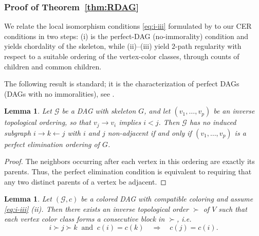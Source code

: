\documentclass[12pt]{amsart}
\theoremstyle{plain}
\newtheorem{lemma}[theorem]{Lemma}
\theoremstyle{definition}
\theoremstyle{remark}
\newcommand{\1}{\mathbf{1}}
\begin{document}
\subsubsection{Proof of Theorem~\ref{thm:RDAG}}

We relate the local isomorphism conditions \eqref{eq:i-iii} formulated by \citet{Seigal23} to our CER conditions in two steps:
(i) is the perfect-DAG (no-immorality) condition and yields chordality of the skeleton, while
(ii)--(iii) yield $2$-path regularity with respect to a suitable
ordering of the vertex-color classes, through counts of children
and common children.


The following result is standard; it is the characterization of perfect DAGs (DAGs with no immoralities),
see \citep[Sec.~2.1.3 and Prop.~2.17]{L96}.

\begin{lemma}\label{lem:revtop_is_peo}
Let $\mathcal G$ be a DAG with skeleton $G$, and let
$(v_1,\ldots,v_p)$ be an inverse topological ordering,
so that $v_j\to v_i$ implies $i<j$.
Then $\mathcal G$ has no induced subgraph
$i\to k\leftarrow j$ with $i$ and $j$ non-adjacent
if and only if $(v_1,\ldots,v_p)$ is a perfect
elimination ordering of $G$.
\end{lemma}

\begin{proof}
The neighbors occurring after each vertex in this ordering
are exactly its parents. Thus, the perfect elimination
condition is equivalent to requiring that any two distinct
parents of a vertex be adjacent.
\end{proof}

\begin{lemma}\label{lem:cpeoRDAG}
Let $(\mathcal{G},c)$ be a colored DAG with compatible coloring and assume \eqref{eq:i-iii} (ii).
Then there exists an inverse topological order $\succ$ of $V$ such that each vertex color class forms a consecutive block in $\succ$, i.e.
\[
i\succ j\succ k \ \text{ and }\ c(i)=c(k)\quad\Longrightarrow\quad c(j)=c(i).
\]
\end{lemma}
\end{document}
